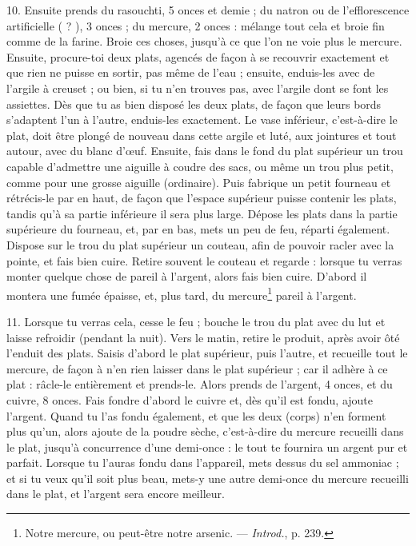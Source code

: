 \documentclass[a4paper, 11pt, oneside, polutonikogreek, french]{article}
\begin{document}
10. Ensuite prends du rasouchti, 5 onces et demie ; du natron ou de l'efflorescence artificielle ( ? ), 3 onces ; du mercure, 2 onces : mélange tout cela et broie fin comme de la farine. Broie ces choses, jusqu'à ce que l'on ne voie plus le mercure. Ensuite, procure-toi deux plats, agencés de façon à se recouvrir exactement et que rien ne puisse en sortir, pas même de l'eau ; ensuite, enduis-les avec de l'argile à creuset ; ou bien, si tu n'en trouves pas, avec l'argile dont se font les assiettes. Dès que tu as bien disposé les deux plats, de façon que leurs bords s'adaptent l'un à l'autre, enduis-les exactement. Le vase inférieur, c'est-à-dire le plat, doit être plongé de nouveau dans cette argile et luté, aux jointures et tout autour, avec du blanc d'œuf. Ensuite, fais dans le fond du plat supérieur un trou capable d'admettre une aiguille à coudre des sacs, ou même un trou plus petit, comme pour une grosse aiguille (ordinaire). Puis fabrique un petit fourneau et rétrécis-le par en haut, de façon que l'espace supérieur puisse contenir les plats, tandis qu'à sa partie inférieure il sera plus large. Dépose les plats dans la partie supérieure du fourneau, et, par en bas, mets un peu de feu, réparti également. Dispose sur le trou du plat supérieur un couteau, afin de pouvoir racler avec la pointe, et fais bien cuire. Retire souvent le couteau et regarde : lorsque tu verras monter quelque chose de pareil à l'argent, alors fais bien cuire. D'abord il montera une fumée épaisse, et, plus tard, du mercure\footnote{Notre mercure, ou peut-être notre arsenic. --- \emph{Introd.}, p. 239.} pareil à l'argent.

11. Lorsque tu verras cela, cesse le feu ; bouche le trou du plat avec du lut et laisse refroidir (pendant la nuit). Vers le matin, retire le produit, après avoir ôté l'enduit des plats. Saisis d'abord le plat supérieur, puis l'autre, et recueille tout le mercure, de façon à n'en rien laisser dans le plat supérieur ; car il adhère à ce plat : râcle-le entièrement et prends-le. Alors prends de l'argent, 4 onces, et du cuivre, 8 onces. Fais fondre d'abord le cuivre et, dès qu'il est fondu, ajoute l'argent. Quand tu l'as fondu également, et que les deux (corps) n'en forment plus qu'un, alors ajoute de la poudre sèche, c'est-à-dire du mercure recueilli dans le plat, jusqu'à concurrence d'une demi-once : le tout te fournira un argent pur et parfait. Lorsque tu l'auras fondu dans l'appareil, mets dessus du sel ammoniac ; et si tu veux qu'il soit plus beau, mets-y une autre demi-once du mercure recueilli dans le plat, et l'argent sera encore meilleur.
\end{document}
